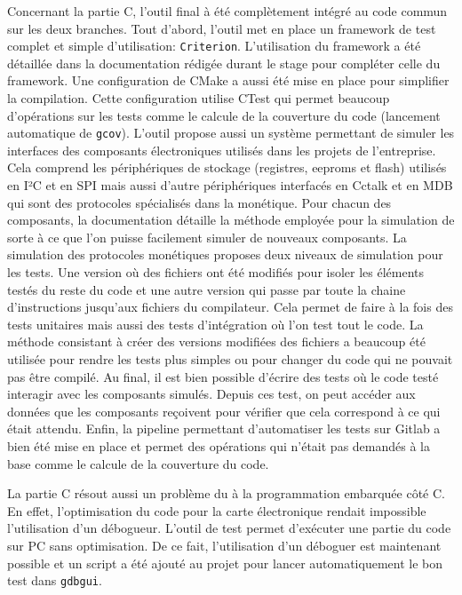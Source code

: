 \documentclass[a4paper]{article}
\begin{document}
Concernant la partie C, l'outil final à été complètement intégré au code commun
sur les deux branches. Tout d'abord, l'outil met en place un framework de test
complet et simple d'utilisation: \verb|Criterion|. L'utilisation du framework a
été détaillée dans la documentation rédigée durant le stage pour compléter celle
du framework. Une configuration de CMake a aussi été mise en place pour
simplifier la compilation. Cette configuration utilise CTest qui permet beaucoup
d'opérations sur les tests comme le calcule de la couverture du code (lancement
automatique de \verb|gcov|). L'outil propose aussi un système permettant de
simuler les interfaces des composants électroniques utilisés dans les projets de
l'entreprise. Cela comprend les périphériques de stockage (registres, eeproms et
flash) utilisés en I²C et en SPI mais aussi d'autre périphériques interfacés en
Cctalk et en MDB qui sont des protocoles spécialisés dans la monétique. Pour
chacun des composants, la documentation détaille la méthode employée pour la
simulation de sorte à ce que l'on puisse facilement simuler de nouveaux
composants. La simulation des protocoles monétiques proposes deux niveaux de
simulation pour les tests. Une version où des fichiers ont été modifiés pour
isoler les éléments testés du reste du code et une autre version qui passe par
toute la chaine d'instructions jusqu'aux fichiers du compilateur. Cela permet de
faire à la fois des tests unitaires mais aussi des tests d'intégration où l'on
test tout le code. La méthode consistant à créer des versions modifiées des
fichiers a beaucoup été utilisée pour rendre les tests plus simples ou pour
changer du code qui ne pouvait pas être compilé. Au final, il est bien possible
d'écrire des tests où le code testé interagir avec les composants simulés.
Depuis ces test, on peut accéder aux données que les composants reçoivent pour
vérifier que cela correspond à ce qui était attendu. Enfin, la pipeline
permettant d'automatiser les tests sur Gitlab a bien été mise en place et permet
des opérations qui n'était pas demandés à la base comme le calcule de la
couverture du code.

La partie C résout aussi un problème du à la programmation embarquée côté C. En
effet, l'optimisation du code pour la carte électronique rendait impossible
l'utilisation d'un débogueur. L'outil de test permet d'exécuter une partie du
code sur PC sans optimisation. De ce fait, l'utilisation d'un déboguer est
maintenant possible et un script a été ajouté au projet pour lancer
automatiquement le bon test dans \verb|gdbgui|.
\end{document}

